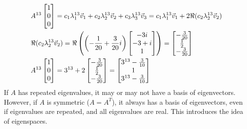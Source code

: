 \documentclass[11pt, fleqn]{article}
\begin{document}
\begin{align*}
    &A^{13}\matrixx{1\\0\\0}=c_1\lambda_1^{13}\vec{v}_1+c_2\lambda_2^{13}\vec{v}_2+c_3\lambda_3^{13}\vec{v}_3=c_1\lambda_1^{13}\vec{v}_1+2\Re(c_2\lambda_2^{13}\vec{v}_2)\\
    &\Re(c_2\lambda_2^{13}\vec{v}_2)=\Re\brround{\brround{-\frac{1}{20}+\frac{3}{20}i}\matrixx{-3i\\-3+i\\1}}=\matrixx{-\frac{3}{20}\\\frac{1}{2}\\-\frac{3}{20}}\\
    &A^{13}\matrixx{1\\0\\0}=3^{13}+2\matrixx{-\frac{3}{20}\\\frac{1}{2}\\-\frac{3}{20}}=\matrixx{3^{13}-\frac{3}{10}\\1\\3^{13}-\frac{3}{10}}
\end{align*}
If $A$ has repeated eigenvalues, it may or may not have a basis of eigenvectors. However, if $A$ is symmetric ($A=A^T$), it always has a basis of eigenvectors, even if eigenvalues are repeated, and all eigenvalues are real. This introduces the idea of eigenspaces.
\end{document}
